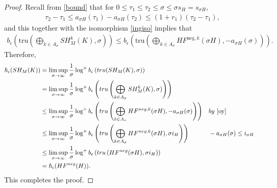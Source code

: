 \documentclass[10pt,a4paper]{amsart}
\begin{document}
\begin{proof}
\vspace{0.2cm}

Recall from \eqref{bound} that for $0 \leq \tau_1 \leq \tau_2 \leq \sigma \leq \sigma s_H = s_{\sigma H}$,
\begin{align*}
\tau_2 - \tau_1 \leq a_{\sigma H}(\tau_1) - a_{\sigma H}(\tau_2) \leq (1+r_1)(\tau_2 - \tau_1),
\end{align*}
and this together with the isomorphism \eqref{ingiso} implies that 
\begin{align}\label{oy}
    b_{\epsilon} \left( \textrm{tru}\left( \bigoplus_{k \in A_\sigma} SH^{k}_M(K),\sigma \right) \right) \leq b_{\epsilon} \left( \textrm{tru}\left(\bigoplus_{k \in A_\sigma}HF^{\textrm{neg},k}(\sigma H),-a_{\sigma H}(\sigma)\right) \right).
\end{align}
Therefore,
\begin{align*}
      \hbar_\epsilon(SH_M(K)) &= \limsup_{\sigma \to \infty}\frac{1}{\sigma} \log^+b_{\epsilon} \left( \textrm{tru}(SH_M(K),\sigma) \right)\\ 
      &=\limsup_{\sigma \to \infty}\frac{1}{\sigma} \log^+b_{\epsilon} \left( \textrm{tru}\left(\bigoplus_{k \in A_\sigma}SH^k_M(K),\sigma)\right) \right)
      \\& \leq\limsup_{\sigma \to \infty}\frac{1}{\sigma} \log^+b_{\epsilon}\left( \textrm{tru}\left(\bigoplus_{k \in A_\sigma}HF^{\textrm{neg},k}(\sigma H),-a_{\sigma H}(\sigma)\right) \right)&&\textrm{by}\,\,\eqref{oy}\\
      & \leq\limsup_{\sigma \to \infty}\frac{1}{\sigma} \log^+b_{\epsilon}\left( \textrm{tru}\left(\bigoplus_{k \in A_\sigma}HF^{\textrm{neg},k}(\sigma H),\sigma i_H\right) \right)&&-a_{\sigma H}(\sigma) \leq  i_{\sigma H}\\
      &\leq\limsup_{\sigma \to \infty}\frac{1}{\sigma} \log^+b_{\epsilon}\left( \textrm{tru}\left(HF^{\textrm{neg}}(\sigma H),\sigma i_H\right) \right)\\
      &= \hbar_{\epsilon}(HF^{\textrm{neg}}(H)).
\end{align*}
This completes the proof.



\end{proof}
\end{document}
